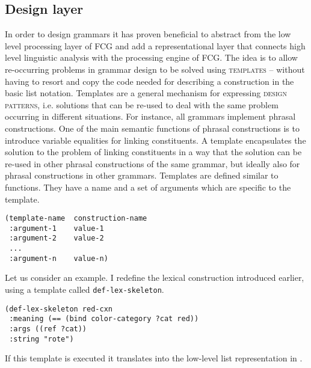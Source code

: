\subsection{Design layer}
In order to design grammars it has proven beneficial
to abstract from the low level processing layer of FCG and 
add a representational layer that connects high level linguistic 
analysis with the processing engine of FCG.
The idea is to allow re-occurring problems in grammar design
to be solved using \textsc{templates} -- without having
to resort and copy the code needed for describing a construction
in the basic list notation. Templates 
are a general mechanism for expressing \textsc{design patterns},
i.e. solutions that can be re-used to deal with the
same problem occurring in different situations. For instance,
all grammars implement phrasal constructions. One 
of the main semantic functions of phrasal constructions 
is to introduce variable equalities for linking constituents.
A template encapsulates the solution to the problem 
of linking constituents in a way that the solution can be re-used in other
phrasal constructions of the same grammar, but ideally also for phrasal constructions in other grammars.
Templates are defined similar to functions. They
have a name and a set of arguments which are specific
to the template.
\ea\label{e:template-syntax}
\begin{lstlisting}[columns=fixed]
(template-name	construction-name
 :argument-1	value-1
 :argument-2	value-2
 ...
 :argument-n	value-n)
\end{lstlisting}\z

Let us consider an example. I redefine the lexical construction introduced earlier,
using a template called 
{\footnotesize\tt def-lex-skeleton}.
\ea\label{e:def-lex-rot}
\begin{lstlisting}
(def-lex-skeleton red-cxn 
 :meaning (== (bind color-category ?cat red)) 
 :args ((ref ?cat))
 :string "rote")
\end{lstlisting}\z
If this template is executed it translates into the 
low-level list representation in . 

